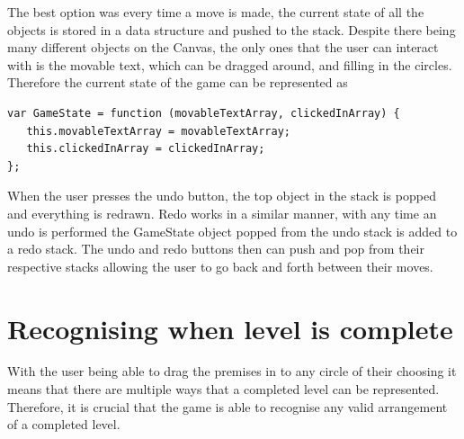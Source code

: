 \documentclass[12pt,a4paper]{report}
\begin{document}
The best option was every time a move is made, the current state of all the objects is stored in a data structure and pushed to the stack. Despite there being many different objects on the Canvas, the only ones that the user can interact with is the movable text, which can be dragged around, and filling in the circles. Therefore the current state of the game can be represented as
 

\begin{lstlisting}
var GameState = function (movableTextArray, clickedInArray) {
   this.movableTextArray = movableTextArray;
   this.clickedInArray = clickedInArray;
};
\end{lstlisting}

 When the user presses the undo button, the top object in the stack is popped and everything is redrawn. 
Redo works in a similar manner, with any time an undo is performed the GameState object popped from the undo stack is added to a redo stack. The undo and redo buttons then can push and pop from their respective stacks allowing the user to go back and forth between their moves.

\section{Recognising when level is complete}
With the user being able to drag the premises in to any circle of their choosing it means that there are multiple ways that a completed level can be represented.
Therefore, it is crucial that the game is able to recognise any valid arrangement of a completed level.
\end{document}
